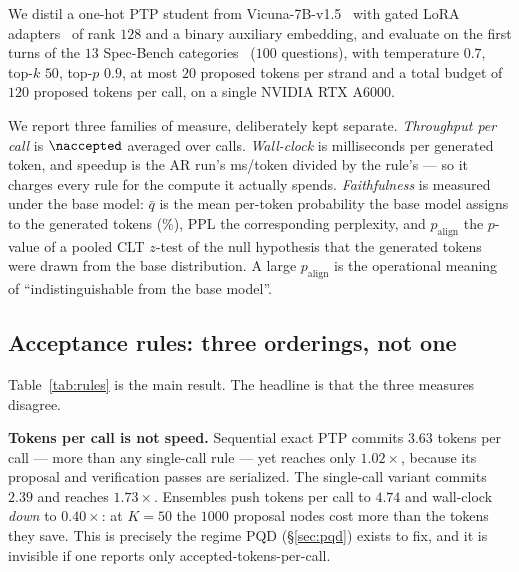 \documentclass{article} %
\makeatletter
\newenvironment{ai}
  {\color{lightgray}%
   \@ifpackageloaded{caption}{\captionsetup{font={color=lightgray}}}{}%
   \let\ai@savedfloatreset\@floatboxreset
   \g@addto@macro\@floatboxreset{\color{lightgray}}}
  {\global\let\@floatboxreset\ai@savedfloatreset}
\makeatother
\begin{document}
\begin{ai}
We distil a one-hot PTP student from Vicuna-7B-v1.5~\citep{zheng2023vicuna} with
gated LoRA adapters~\citep{hu2022lora} of rank $128$ and a binary auxiliary
embedding, and evaluate on the first turns of the $13$ Spec-Bench
categories~\citep{xia2024specbench} ($100$ questions), with temperature $0.7$,
top-$k$ $50$, top-$p$ $0.9$, at most $20$ proposed tokens per strand and a total
budget of $120$ proposed tokens per call, on a single NVIDIA RTX A6000.

We report three families of measure, deliberately kept separate.
\emph{Throughput per call} is $\naccepted$ averaged over calls.
\emph{Wall-clock} is milliseconds per generated token, and speedup is the AR
run's ms/token divided by the rule's --- so it charges every rule for the compute
it actually spends. \emph{Faithfulness} is measured under the base model:
$\bar q$ is the mean per-token probability the base model assigns to the
generated tokens ($\%$), PPL the corresponding perplexity, and
$p_{\mathrm{align}}$ the $p$-value of a pooled CLT $z$-test of the null
hypothesis that the generated tokens were drawn from the base distribution. A
large $p_{\mathrm{align}}$ is the operational meaning of ``indistinguishable from
the base model''.

\subsection{Acceptance rules: three orderings, not one}
\label{sec:exp:rules}

Table~\ref{tab:rules} is the main result. The headline is that the three measures
disagree.

\begin{table}[t]
  \centering
  \caption{Acceptance rules on Spec-Bench. $\bar q$ is the mean per-token
  probability under the base model, $p_{\mathrm{align}}$ the $p$-value for
  ``generated tokens came from the base distribution''. $^\dagger$
  distribution-preserving by construction. Numbers are preliminary: single-seed
  runs on $100$ Spec-Bench first turns.}
  \label{tab:rules}
  \small
  
\end{table}

\textbf{Tokens per call is not speed.} Sequential exact PTP commits $3.63$ tokens
per call --- more than any single-call rule --- yet reaches only $1.02\times$,
because its proposal and verification passes are serialized. The single-call
variant commits $2.39$ and reaches $1.73\times$. Ensembles push tokens per call
to $4.74$ and wall-clock \emph{down} to $0.40\times$: at $K = 50$ the $1000$
proposal nodes cost more than the tokens they save. This is precisely the regime
PQD (\S\ref{sec:pqd}) exists to fix, and it is invisible if one reports only
accepted-tokens-per-call.


\end{ai}
\end{document}
